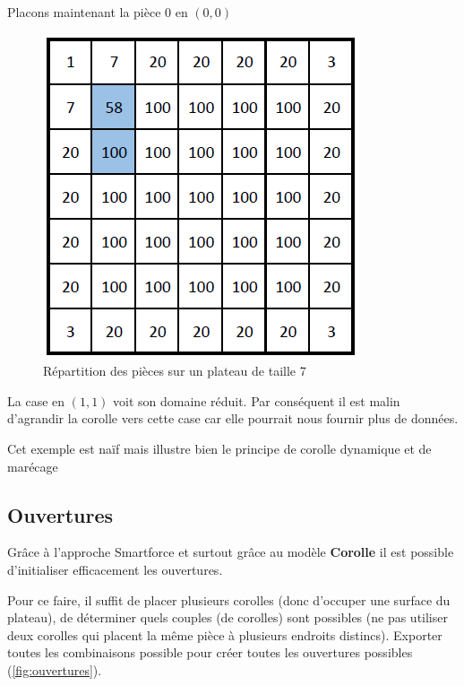 \begin{exmp}
		Placons maintenant la pièce 0 en $(0,0)$ 
		
		\begin{figure}[H]
			\centering
			\includegraphics{images/corolle_dynamique_agrandissement}
			\caption[Répartition des pièces sur un plateau de taille 7]{Répartition des pièces sur un plateau de taille 7}
			\label{fig:corolle_dynamique_agrandissement}
		\end{figure}
		
		La case en $(1,1)$ voit son domaine réduit. Par conséquent il est malin d'agrandir la corolle vers cette case car elle pourrait nous fournir plus de données.

		\begin{note}
			Cet exemple est naïf mais illustre bien le principe de corolle dynamique et de marécage
		\end{note}
	\end{exmp}
	\newpage
	
	\subsection{Ouvertures}
	
	Grâce à l'approche Smartforce et surtout grâce au modèle \textbf{Corolle} il est possible d'initialiser efficacement les ouvertures.
	
	Pour ce faire, il suffit de placer plusieurs corolles (donc d'occuper une surface du plateau), de déterminer quels couples (de corolles) sont possibles (ne pas utiliser deux corolles qui placent la même pièce à plusieurs endroits distincs). Exporter toutes les combinaisons possible pour créer toutes les ouvertures possibles (\autoref{fig:ouvertures}).
	

